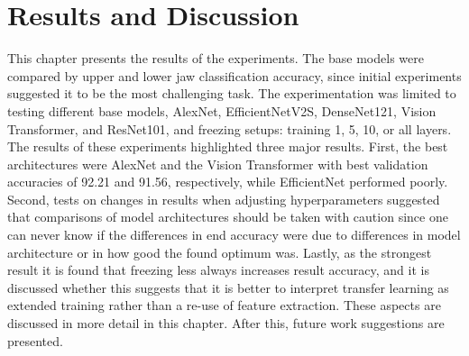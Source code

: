 \documentclass[english,twoside,openright]{UH_DS_MSc}
\begin{document}
\chapter{Results and Discussion}

This chapter presents the results of the experiments. The base models were compared by
upper and lower jaw classification accuracy, since initial experiments suggested it to be the most challenging task. The experimentation was limited to testing different base models, AlexNet, EfficientNetV2S, 
DenseNet121, Vision Transformer, and ResNet101, and freezing setups: training 1, 5, 10, or all layers.
The results of these experiments highlighted three major results. First, the best architectures were AlexNet and the Vision 
Transformer with best validation accuracies of 92.21 and 91.56, respectively, while EfficientNet performed poorly. Second, tests on changes in results 
when adjusting hyperparameters suggested that comparisons of model architectures should be taken with caution since one can never know 
if the differences in end accuracy were due to differences in model architecture or in how good the found optimum was. Lastly, as the strongest result it is found that freezing less 
always increases result accuracy, and it is discussed whether this suggests that it is better to interpret transfer learning as extended 
training rather than a re-use of feature extraction. These aspects are discussed in more detail in this chapter. After this, future work suggestions are presented.
\end{document}
